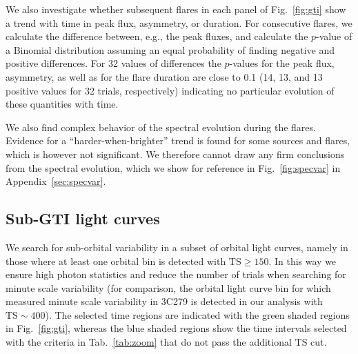\documentclass[twocolumn,linenumbers]{aastex62}
\begin{document}
We also investigate whether subsequent flares in each panel of Fig.~\ref{fig:gti} show a trend with time in peak flux, asymmetry, or duration. 
For consecutive flares, we calculate the difference between, e.g., the peak fluxes, and calculate the $p$-value of a Binomial distribution assuming an equal probability of finding negative and positive differences.
For 32 values of differences the $p$-values for the peak flux, asymmetry, as well as for the flare duration are close to 0.1 (14, 13, and 13 positive values for 32 trials, respectively) indicating no particular evolution of these quantities with time. 

We also find complex behavior of the spectral evolution during the flares. Evidence for a  ``harder-when-brighter'' trend is found for some sources and flares, which is however not significant. 
We therefore cannot draw any firm conclusions from the spectral evolution, which we show for reference in Fig.~\ref{fig:specvar} in  Appendix~\ref{sec:specvar}. 



\subsection{Sub-GTI light curves}
\label{sec:sub-gti}
We search for sub-orbital variability in a subset of orbital light curves, namely in those where at least one orbital bin is detected with $\mathrm{TS} \geqslant 150$. 
In this way we ensure high photon statistics and reduce the number of trials when searching for minute scale variability (for comparison, the orbital light curve bin for which \citet{TheFermi-LAT:2016dss} measured minute scale variability in 3C279 is detected in our analysis with $\mathrm{TS} \sim 400$). 
The selected time regions are indicated with the green shaded regions in Fig.~\ref{fig:gti}, whereas the blue shaded regions show the time intervals selected with the criteria in Tab.~\ref{tab:zoom} that do not pass the additional $\mathrm{TS}$ cut.
\end{document}
